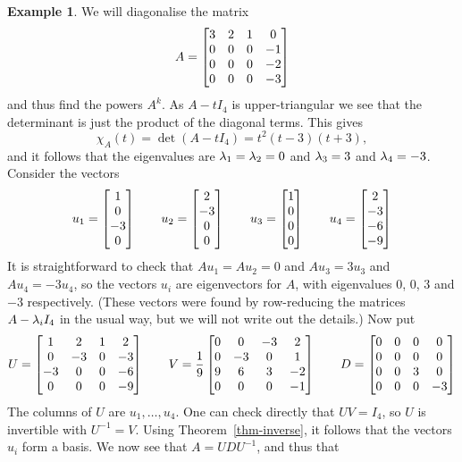 \documentclass[reqno]{amsart}
\theoremstyle{definition}
\newtheorem{example}[theorem]{Example}
\begin{document}
\begin{example}\label{eg-diag-iv}
 We will diagonalise the matrix
 \[ A = \left[\begin{matrix} 3 & 2 & 1 &  0 \\
             0 & 0 & 0 & -1 \\
             0 & 0 & 0 & -2 \\
             0 & 0 & 0 & -3 \end{matrix}\right]
 \]
 and thus find the powers $A^k$.  As $A-tI_4$ is upper-triangular we
 see that the determinant is just the product of the diagonal terms.
 This gives
 \[ \chi_A(t) = \det(A-tI_4) = t^2(t-3)(t+3), \]
 and it follows that the eigenvalues are $\lambda_1=\lambda_2=0$ and $\lambda_3=3$
 and $\lambda_4=-3$.  Consider the vectors
 \[ u_1 = \left[\begin{matrix} 1 \\  0 \\ -3 \\  0 \end{matrix}\right] \qquad
    u_2 = \left[\begin{matrix} 2 \\ -3 \\  0 \\  0 \end{matrix}\right] \qquad
    u_3 = \left[\begin{matrix} 1 \\  0 \\  0 \\  0 \end{matrix}\right] \qquad
    u_4 = \left[\begin{matrix} 2 \\ -3 \\ -6 \\ -9 \end{matrix}\right]
 \]
 It is straightforward to check that $Au_1=Au_2=0$ and $Au_3=3u_3$ and
 $Au_4=-3u_4$, so the vectors $u_i$ are eigenvectors for $A$, with 
 eigenvalues $0$, $0$, $3$ and $-3$ respectively.  (These vectors
 were found by row-reducing the matrices $A-\lambda_iI_4$ in the usual
 way, but we will not write out the details.)  Now put 
 \[ U = \left[\begin{matrix} 1 &  2 & 1 &  2 \\
             0 & -3 & 0 & -3 \\
            -3 &  0 & 0 & -6 \\
             0 &  0 & 0 & -9 \end{matrix}\right] 
    \qquad
    V = \frac{1}{9}\left[\begin{matrix} 
     0&0&-3&2\\
     0&-3&0&1\\ 
     9&6&3&-2\\ 
     0&0&0&-1
    \end{matrix}\right]
    \qquad
    D = \left[\begin{matrix} 0 & 0 & 0 &  0 \\
             0 & 0 & 0 &  0 \\
             0 & 0 & 3 &  0 \\
             0 & 0 & 0 & -3 \end{matrix}\right]
 \]
 The columns of $U$ are $u_1,\dotsc,u_4$.  One can check directly that
 $UV=I_4$, so $U$ is invertible with $U^{-1}=V$.  Using
 Theorem~\ref{thm-inverse}, it follows that the vectors $u_i$ form a
 basis.  We now see that $A=UDU^{-1}$, and thus that

\end{example}
\end{document}
